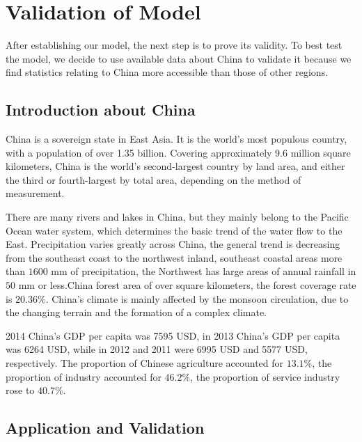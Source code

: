 \section{Validation of Model}
After establishing our model, the next step is to prove its validity. To best test the model, we decide to use available data about China to validate it because we find statistics relating to China more accessible than those of other regions.

\subsection{Introduction about China}
China is a sovereign state in East Asia. It is the world's most populous country, with a population of over 1.35 billion. Covering approximately 9.6 million square kilometers, China is the world's second-largest country by land area, and either the third or fourth-largest by total area, depending on the method of measurement.

There are many rivers and lakes in China, but they mainly belong to the Pacific Ocean water system, which determines the basic trend of the water flow to the East. Precipitation varies greatly across China, the general trend is decreasing from the southeast coast to the northwest inland, southeast coastal areas more than $1600$ mm of precipitation, the Northwest has large areas of annual rainfall in $50$ mm or less.China forest area of over square kilometers, the forest coverage rate is $20.36\%$. China's climate is mainly affected by the monsoon circulation, due to the changing terrain and the formation of a complex climate.

2014 China's GDP per capita was 7595 USD, in 2013 China's GDP per capita was 6264 USD, while in 2012 and 2011 were 6995 USD and 5577 USD, respectively. The proportion of Chinese agriculture accounted for $13.1\%$, the proportion of industry accounted for $46.2\%$, the proportion of service industry rose to $40.7\%$.

\subsection{Application and Validation}
